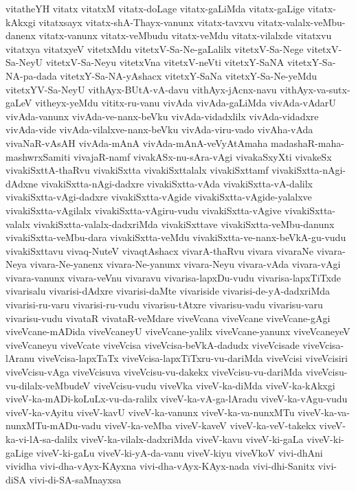 {vitatheYH
vitatx
vitatxM
vitatx-doLage
vitatx-gaLiMda
vitatx-gaLige
vitatx-kAkxgi
vitatxsayx
vitatx-shA-Thayx-vanunx
vitatx-tavxvu
vitatx-valalx-veMbu-danenx
vitatx-vanunx
vitatx-veMbudu
vitatx-veMdu
vitatx-vilalxde
vitatxvu
vitatxya
vitatxyeV
vitetxMdu
vitetxV-Sa-Ne-gaLalilx
vitetxV-Sa-Nege
vitetxV-Sa-NeyU
vitetxV-Sa-Neyu
vitetxVna
vitetxV-neVti
vitetxY-SaNA
vitetxY-Sa-NA-pa-dada
vitetxY-Sa-NA-yAshacx
vitetxY-SaNa
vitetxY-Sa-Ne-yeMdu
vitetxYV-Sa-NeyU
vithAyx-BUtA-vA-davu
vithAyx-jAcnx-navu
vithAyx-va-sutx-gaLeV
vitheyx-yeMdu
vititx-ru-vanu
vivAda
vivAda-gaLiMda
vivAda-vAdarU
vivAda-vanunx
vivAda-ve-nanx-beVku
vivAda-vidadxlilx
vivAda-vidadxre
vivAda-vide
vivAda-vilalxve-nanx-beVku
vivAda-viru-vado
vivAha-vAda
vivaNaR-vAsAH
vivAda-mAnA
vivAda-mAnA-veVyAtAmaha madashaR-maha-mashwrxSamiti
vivajaR-namf
vivakASx-nu-sAra-vAgi
vivakaSxyXti
vivakeSx
vivakiSxttA-thaRvu
vivakiSxtta
vivakiSxttalalx
vivakiSxttamf
vivakiSxtta-nAgi-dAdxne
vivakiSxtta-nAgi-dadxre
vivakiSxtta-vAda
vivakiSxtta-vA-dalilx
vivakiSxtta-vAgi-dadxre
vivakiSxtta-vAgide
vivakiSxtta-vAgide-yalalxve
vivakiSxtta-vAgilalx
vivakiSxtta-vAgiru-vudu
vivakiSxtta-vAgive
vivakiSxtta-valalx
vivakiSxtta-valalx-dadxriMda
vivakiSxttave
vivakiSxtta-veMbu-danunx
vivakiSxtta-veMbu-dara
vivakiSxtta-veMdu
vivakiSxtta-ve-nanx-beVkA-gu-vudu
vivakiSxttavu
vivaq-NuteV
vivaqtAshacx
vivarA-thaRvu
vivara
vivaraNe
vivara-Neya
vivara-Ne-yanenx
vivara-Ne-yanunx
vivara-Neyu
vivara-vAda
vivara-vAgi
vivara-vanunx
vivara-veVnu
vivaravu
vivarisa-lapxDu-vudu
vivarisa-lapxTiTxde
vivarisalu
vivarisi-dAdxre
vivarisi-daMte
vivariside
vivarisi-de-yA-dadxriMda
vivarisi-ru-varu
vivarisi-ru-vudu
vivarisu-tAtxre
vivarisu-vadu
vivarisu-varu
vivarisu-vudu
vivataR
vivataR-veMdare
viveVcana
viveVcane
viveVcane-gAgi
viveVcane-mADida
viveVcaneyU
viveVcane-yalilx
viveVcane-yanunx
viveVcaneyeV
viveVcaneyu
viveVcate
viveVcisa
viveVcisa-beVkA-dadudx
viveVcisade
viveVcisa-lAranu
viveVcisa-lapxTaTx
viveVcisa-lapxTiTxru-vu-dariMda
viveVcisi
viveVcisiri
viveVcisu-vAga
viveVcisuva
viveVcisu-vu-dakekx
viveVcisu-vu-dariMda
viveVcisu-vu-dilalx-veMbudeV
viveVcisu-vudu
viveVka
viveV-ka-diMda
viveV-ka-kAkxgi
viveV-ka-mADi-koLuLx-vu-da-ralilx
viveV-ka-vA-ga-lAradu
viveV-ka-vAgu-vudu
viveV-ka-vAyitu
viveV-kavU
viveV-ka-vanunx
viveV-ka-va-nunxMTu
viveV-ka-va-nunxMTu-mADu-vadu
viveV-ka-veMba
viveV-kaveV
viveV-ka-veV-takekx
viveV-ka-vi-lA-sa-dalilx
viveV-ka-vilalx-dadxriMda
viveV-kavu
viveV-ki-gaLa
viveV-ki-gaLige
viveV-ki-gaLu
viveV-ki-yA-da-vanu
viveV-kiyu
viveVkoV
vivi-dhAni
vividha
vivi-dha-vAyx-KAyxna
vivi-dha-vAyx-KAyx-nada
vivi-dhi-Sanitx
vivi-diSA
vivi-di-SA-saMnayxsa
}
